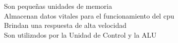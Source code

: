 \documentclass[preview]{standalone}
\begin{document}
Son pequeñas unidades de memoria\\Almacenan datos vitales
para el funcionamiento del cpu\\Brindan una respuesta de alta velocidad\\Son utilizados por la Unidad de Control y la ALU\\
\end{document}
